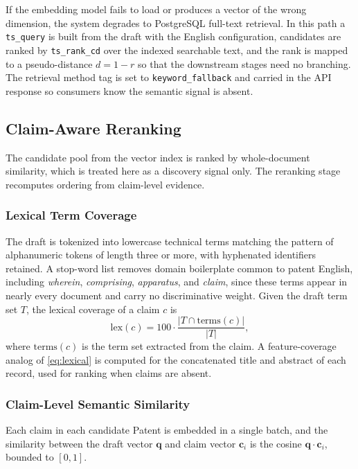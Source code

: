 \documentclass[journal]{IEEEtran}
\begin{document}
If the embedding model fails to load or produces a vector of the wrong dimension, the system degrades to PostgreSQL full-text retrieval. In this path a \texttt{ts\_query} is built from the draft with the English configuration, candidates are ranked by \texttt{ts\_rank\_cd} over the indexed searchable text, and the rank is mapped to a pseudo-distance $d = 1 - r$ so that the downstream stages need no branching. The retrieval method tag is set to \texttt{keyword\_fallback} and carried in the API response so consumers know the semantic signal is absent.

\subsection{Claim-Aware Reranking}
The candidate pool from the vector index is ranked by whole-document similarity, which is treated here as a discovery signal only. The reranking stage recomputes ordering from claim-level evidence.

\subsubsection{Lexical Term Coverage}
The draft is tokenized into lowercase technical terms matching the pattern of alphanumeric tokens of length three or more, with hyphenated identifiers retained. A stop-word list removes domain boilerplate common to patent English, including \emph{wherein}, \emph{comprising}, \emph{apparatus}, and \emph{claim}, since these terms appear in nearly every document and carry no discriminative weight. Given the draft term set $T$, the lexical coverage of a claim $c$ is
\begin{equation}
\mathrm{lex}(c) = 100 \cdot \frac{|T \cap \mathrm{terms}(c)|}{|T|},
\label{eq:lexical}
\end{equation}
where $\mathrm{terms}(c)$ is the term set extracted from the claim. A feature-coverage analog of \eqref{eq:lexical} is computed for the concatenated title and abstract of each record, used for ranking when claims are absent.

\subsubsection{Claim-Level Semantic Similarity}
Each claim in each candidate Patent is embedded in a single batch, and the similarity between the draft vector $\mathbf{q}$ and claim vector $\mathbf{c}_i$ is the cosine $\mathbf{q} \cdot \mathbf{c}_i$, bounded to $[0, 1]$.
\end{document}
